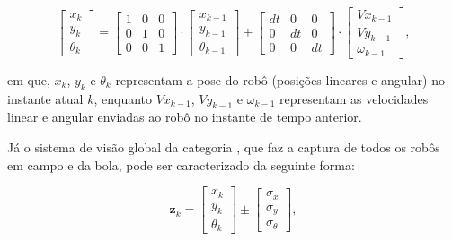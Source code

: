 \documentclass[acronym, symbols, table, deposito]{fei}
\begin{document}
		\begin{equation}\label{eq:modelo_sistema_ssl}
			\begin{bmatrix}
				x_k \\
				y_k \\
				\theta_k
			\end{bmatrix} = 
			\begin{bmatrix}
				1 & 0 & 0 \\
				0 & 1 & 0 \\
				0 & 0 & 1
			\end{bmatrix} \cdot
			\begin{bmatrix}
				x_{k-1} \\
				y_{k-1} \\
				\theta_{k-1}
			\end{bmatrix} + 
			\begin{bmatrix}
				dt & 0 & 0 \\
				0 & dt & 0 \\
				0 & 0 & dt
			\end{bmatrix} \cdot
			\begin{bmatrix}
				Vx_{k-1} \\
				Vy_{k-1} \\
				\omega_{k-1}
			\end{bmatrix},
		\end{equation}
		
		em que, $x_k$, $y_k$ e $\theta_k$ representam a pose do robô (posições lineares e angular) no instante atual $k$, enquanto $Vx_{k-1}$, $Vy_{k-1}$ e $\omega_{k-1}$ representam as velocidades linear e angular enviadas ao robô no instante de tempo anterior.
		
		Já o sistema de visão global da categoria , que faz a captura de todos os robôs em campo e da bola, pode ser caracterizado da seguinte forma:
		
		\begin{equation}\label{eq:modelo_visao_ssl}
			\textbf{z}_k  = 
			\begin{bmatrix}
				x_k \\
				y_k \\
				\theta_k
			\end{bmatrix} \pm
			\begin{bmatrix}
				\sigma_x \\
				\sigma_y \\
				\sigma_{\theta}
			\end{bmatrix},
		\end{equation}
	
\end{document}
